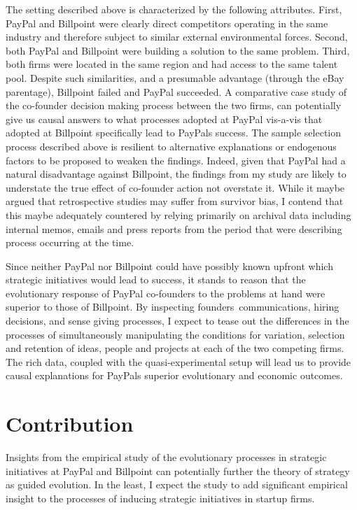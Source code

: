 \documentclass[12pt,letterpaper]{article}
\begin{document}
The setting described above is characterized by the following attributes. First, PayPal and Billpoint were clearly direct competitors operating in the same industry and therefore subject to similar external environmental forces. Second, both PayPal and Billpoint were building a solution to the same problem. Third, both firms were located in the same region and had access to the same talent pool. Despite such similarities, and a presumable advantage (through the eBay parentage), Billpoint failed and PayPal succeeded. A comparative case study of the co-founder decision making process between the two firms, can potentially give us causal answers to what processes adopted at PayPal vis-a-vis that adopted at Billpoint specifically lead to PayPal\textquotesingle s success. The sample selection process described above is resilient to alternative explanations or endogenous factors to be proposed to weaken the findings. Indeed, given that PayPal had a natural disadvantage against Billpoint, the findings from my study are likely to understate the true effect of co-founder action not overstate it.
While it maybe argued that retrospective studies may suffer from survivor bias, I contend that this maybe adequately countered by relying primarily on archival data including internal memos, emails and press reports from the period that were describing process occurring at the time. 

Since neither PayPal nor Billpoint could have  possibly known upfront which strategic initiatives would lead to success, it stands to reason that the evolutionary response of PayPal co-founders to the problems at hand were superior to those of Billpoint. By inspecting founders\textquotesingle \ communications, hiring decisions, and sense giving processes, I expect to tease out the differences in the processes of simultaneously manipulating the conditions for variation, selection and retention of ideas, people and projects at each of the two competing firms. The rich data, coupled with the quasi-experimental setup will lead us to provide causal explanations for PayPal\textquotesingle s superior evolutionary and economic outcomes.

\section{Contribution}
Insights from the empirical study of the evolutionary processes in strategic initiatives at PayPal and Billpoint can potentially further the theory of strategy as guided evolution. In the least, I expect the study to add significant empirical insight to the processes of inducing strategic initiatives in startup firms.
\end{document}
